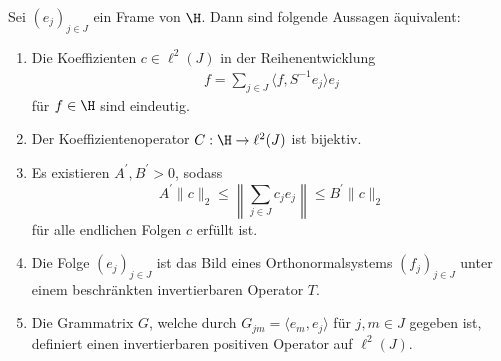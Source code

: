 \begin{sz}
	Sei $ (e_j)_{j \in J} $ ein Frame von $ \H $.
	Dann sind folgende Aussagen äquivalent:
	\begin{enumerate}[label =\textbf{(\roman*)}]
		\item Die Koeffizienten $ c \in \ell^2(J) $ in der Reihenentwicklung
		\begin{align*}
		f = \sum \limits_{j \in J} \langle f, S^{-1} e_j \rangle e_j
		\end{align*}
		für $ f \in \H $ sind eindeutig.
		
		\item
		Der Koeffizientenoperator $ C : \H \to \ell^2(J) $ ist bijektiv.
		
		\item
		Es existieren $ A^\prime , B^\prime > 0 $, sodass
		\begin{equation}\label{eq:frame_equivalence_1}
		A^\prime \| c \|_2
		\leq
		\left\| \sum \limits_{j \in J} c_j e_j \right\|
		\leq 
		B^\prime \|c\|_2
		\end{equation}
		für alle endlichen Folgen $ c $ erfüllt ist.
		
		\item
		Die Folge $ (e_j)_{j \in J} $ ist das Bild eines Orthonormalsystems $ (f_j)_{j \in J} $
		unter einem beschränkten invertierbaren Operator $ T$.
		
		\item
		Die Grammatrix $ G $, welche durch
		$ G_{jm} = \langle e_m , e_j  \rangle$ für $ j,m \in J $
		gegeben ist,
		definiert einen invertierbaren positiven Operator auf $ \ell^2(J) $.		
		\end{enumerate}
\end{sz}

